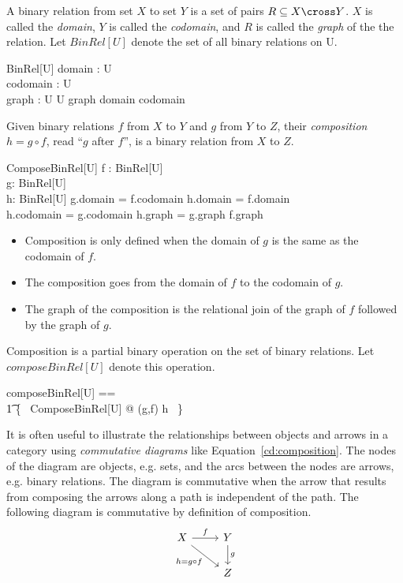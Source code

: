 \documentclass{article}
\begin{document}
A binary relation from set $X$ to set $Y$ is a set of pairs $R \subseteq X \cross Y$.
$X$ is called the {\it domain}, $Y$ is called the {\it codomain}, and $R$ is called the {\it graph} of the the relation.
Let $BinRel[U]$ denote the set of all binary relations on U.
\begin{schema}{BinRel}[U]
	domain : \power U \\
	codomain : \power U \\
	graph : U \rel U
\where
	graph \in domain \rel codomain
\end{schema}

Given binary relations $f$ from $X$ to $Y$ and $g$ from $Y$ to $Z$, their {\it composition} $h = g \circ f$, read ``$g$ after $f$'', 
is a binary relation from $X$ to $Z$.
\begin{schema}{ComposeBinRel}[U]
	f : BinRel[U] \\
	g: BinRel[U] \\
	h: BinRel[U]
\where
	g.domain = f.codomain
\also
	h.domain = f.domain \\
	h.codomain = g.codomain
\also
	h.graph = g.graph \circ f.graph
\end{schema}
\begin{itemize}
\item Composition is only defined when the domain of $g$ is the same as the codomain of $f$.
\item The composition goes from the domain of $f$ to the codomain of $g$.
\item The graph of the composition is the relational join of the graph of $f$ followed by the graph of $g$.
\end{itemize}

Composition is a partial binary operation on the set of binary relations.
Let $composeBinRel[U]$ denote this operation.
\begin{zed}
	composeBinRel[U] == \\
\t1		\{~ ComposeBinRel[U] @ (g,f) \mapsto h ~\}
\end{zed}




It is often useful to illustrate the relationships between objects and arrows in a category using {\it commutative diagrams}
like Equation~\ref{cd:composition}.
The nodes of the diagram are objects, e.g. sets, and the arcs between the nodes are arrows, e.g. binary relations.
The diagram is commutative when the arrow that results from composing the arrows along a path is independent of the path.
The following diagram is commutative by definition of composition.
\begin{equation}
\label{cd:composition}
\begin{tikzcd}
X \arrow{r}{f} \arrow{rd}[swap]{h = g \circ f}
				&Y \arrow{d}{g} \\
				&Z
\end{tikzcd}
\end{equation} 
\end{document}
